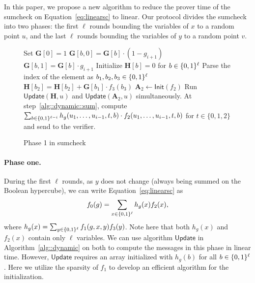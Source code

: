 In this paper, we propose a new algorithm to reduce the prover time of the sumcheck on Equation~\ref{eq:linearsc} to linear. Our protocol divides the sumcheck into two phases: the first $\ell$ rounds bounding the variables of $x$ to a random point $u$, and the last $\ell$ rounds bounding the variables of $y$ to a random point $v$.

\begin{figure}[b!]
	\begin{algorithm}[H]
		\caption{Phase 1 in sumcheck}\label{alg::phase1}
		\begin{algorithmic}[1]
			\State Set $\textbf{G}[0] = 1$
			\State $\textbf{G}[b,0] = \textbf{G}[b]\cdot(1-g_{i+1})$
			\State $\textbf{G}[b,1] = \textbf{G}[b]\cdot g_{i+1}$
			\EndFor
			\EndFor
			\EndProcedure
			\State Initialize $\textbf{H}[b] = 0$ for $b\in\{0,1\}^\ell$
			\State Parse the index of the element as $b_1,b_2,b_3\in\{0,1\}^\ell$
			\State\label{alg::phase1::init} $\textbf{H}[b_2] = \textbf{H}[b_2]+ \textbf{G}[b_1]\cdot f_3(b_3)$
			\EndFor
			\EndProcedure
			\State $\textbf{A}_2\leftarrow\mathsf{Init}(f_2)$
			\State Run $\mathsf{Update}(\textbf{H},u)$ and $\mathsf{Update}(\textbf{A}_2,u)$ simultaneously. At step~\ref{alg::dynamic::sum}, compute $\sum_{b\in\{0,1\}^{\ell-i}}h_g(u_1,\ldots, u_{i-1}, t, b)\cdot f_2(u_1,\ldots, u_{i-1}, t, b)$ for $t\in\{0,1,2\}$ and send to the verifier.
			\EndProcedure
		\end{algorithmic}
	\end{algorithm}
\end{figure}



\paragraph{Phase one.} 
During the first $\ell$ rounds, as $y$ does not change (always being summed on the Boolean hypercube), we can write Equation~\ref{eq:linearsc} as 
\[
f_0(g) = \sum_{x\in\{0,1\}^\ell} h_g(x)f_2(x),
\]
where $h_g(x) = \sum_{y\in\{0,1\}^\ell}f_1(g,x,y)f_3(y)$. Note here that both $h_g(x)$ and $f_2(x)$ contain only $\ell$ variables. We can use algorithm $\mathsf{Update}$ in Algorithm~\ref{alg::dynamic} on both to compute the messages in this phase in linear time. However, $\mathsf{Update}$ requires an array initialized with $h_g(b)$ for all $b\in\{0,1\}^\ell$. Here we utilize the sparsity of $f_1$ to develop an efficient algorithm for the initialization.

